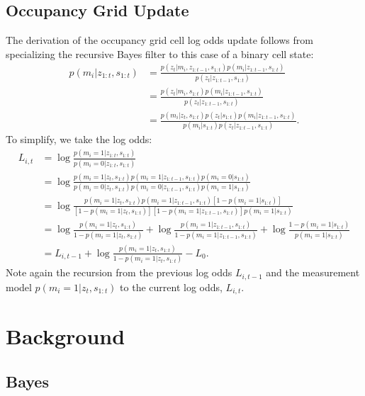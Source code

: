 \documentclass{article}
\begin{document}
\subsection{Occupancy Grid Update}

The derivation of the occupancy grid cell log odds update follows from specializing the recursive Bayes filter to this case of a binary cell state:
\begin{align}
p(m_i | z_{1:t}, s_{1:t}) &= \frac{p(z_t | m_i, z_{1:t-1}, s_{1:t}) p(m_i | z_{1:t-1}, s_{1:t})}{p(z_t | z_{1:t-1}, s_{1:t})} \\
&= \frac{p(z_t | m_i, s_{1:t}) p(m_i | z_{1:t-1}, s_{1:t})}{p(z_t | z_{1:t-1}, s_{1:t})} \\
&= \frac{p(m_i | z_t, s_{1:t}) p(z_t | s_{1:t}) p(m_i | z_{1:t-1}, s_{1:t})}{p(m_i | s_{1:t})p(z_t | z_{1:t-1}, s_{1:t})}.
\end{align}
To simplify, we take the log odds:
\begin{align}
L_{i, t} &= \log \frac{p(m_i = 1 | z_{1:t}, s_{1:t})}{p(m_i = 0| z_{1:t}, s_{1:t})} \\
&= \log \frac{p(m_i = 1 | z_t, s_{1:t}) p(m_i = 1 | z_{1:t-1}, s_{1:t}) p(m_i = 0 | s_{1:t})}{p(m_i = 0 | z_t, s_{1:t}) p(m_i = 0 | z_{1:t-1}, s_{1:t}) p(m_i = 1 | s_{1:t})} \\
&= \log \frac{p(m_i = 1 | z_t, s_{1:t}) p(m_i = 1 | z_{1:t-1}, s_{1:t}) [1 - p(m_i = 1 | s_{1:t})]}{[1 - p(m_i = 1 | z_t, s_{1:t})] [1 - p(m_i = 1 | z_{1:t-1}, s_{1:t})] p(m_i = 1 | s_{1:t})} \\
&= \log \frac{p(m_i = 1 | z_t, s_{1:t})}{1 - p(m_i = 1 | z_t, s_{1:t})} + \log \frac{p(m_i = 1 | z_{1:t-1}, s_{1:t})}{1 - p(m_i = 1 | z_{1:t-1}, s_{1:t})} + \log \frac{1 - p(m_i = 1 | s_{1:t})}{p(m_i = 1 | s_{1:t})} \\
&= L_{i, t-1} + \log \frac{p(m_i = 1 | z_t, s_{1:t})}{1 - p(m_i = 1 | z_t, s_{1:t})} - L_0.
\end{align}
Note again the recursion from the previous log odds $L_{i, t-1}$ and the measurement model $p(m_i = 1 | z_t, s_{1:t})$ to the current log odds, $L_{i, t}$.

\section{Background}

\subsection{Bayes}
\end{document}

